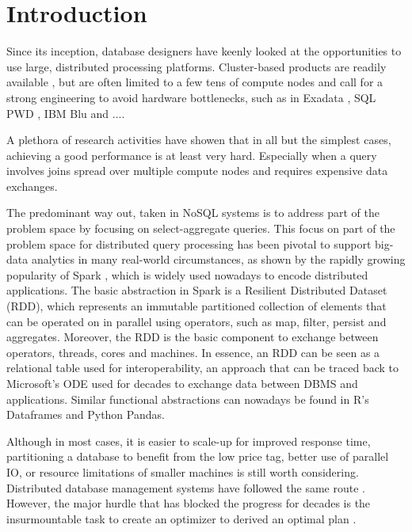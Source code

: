 \section{Introduction}
\label{Introduction}
Since its inception, database designers have keenly looked at the opportunities to use large,
distributed processing platforms. Cluster-based products are readily available \cite{},
but are often limited to a few tens of compute nodes and call for a strong engineering
to avoid hardware bottlenecks, such as in Exadata \cite{}, SQL PWD \cite{}, IBM Blu \cite{} and ....

A plethora of research activities have showen that in all but the simplest cases,
achieving a good performance is at least very hard. Especially when a query
involves joins spread over multiple compute nodes and requires expensive data exchanges.

The predominant way out, taken in NoSQL systems  \cite{Casandra,Impala}
is to address part of the problem space by focusing on select-aggregate queries.
This focus on part of the problem space for distributed query processing has
been pivotal to support big-data analytics in many real-world circumstances,
as shown by the rapidly growing popularity of Spark \cite{},
which is widely used nowadays to encode distributed applications.
The basic abstraction in Spark is a Resilient Distributed Dataset (RDD),
which represents an immutable partitioned collection of elements that can be
operated on in parallel using operators, such as map, filter, persist and aggregates.
Moreover, the RDD is the basic component to exchange between
operators, threads, cores and machines.
In essence, an RDD can be seen as a relational table used for interoperability,
an approach that can be traced back to Microsoft's ODE \cite{} used for decades
to exchange data between DBMS and applications. Similar functional abstractions
can nowadays be found in R's Dataframes \cite{} and Python Pandas\cite{}.


Although in most cases, it is easier to scale-up for improved response time,
partitioning a database to benefit from the low price tag, better use of parallel IO,
or resource limitations of smaller machines is still worth considering.
Distributed database management systems have followed the same route \cite{distributed DB}.
However, the major hurdle that has blocked the progress for decades is the insurmountable task
to create an optimizer to derived an optimal plan \cite{}.


